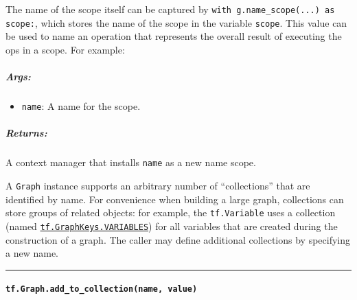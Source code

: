 The name of the scope itself can be captured by
\lstinline{with g.name_scope(...) as scope:}, which stores the name of
the scope in the variable \lstinline{scope}. This value can be used to name
an operation that represents the overall result of executing the ops in
a scope. For example:

\begin{Shaded}
\begin{Highlighting}[]
\OperatorTok{=} 
 \NormalTok{) } 
  \OperatorTok{=} \OperatorTok{=}\NormalTok{)}
  \OperatorTok{=} \OperatorTok{=}\NormalTok{)}
  \OperatorTok{=} \OperatorTok{+} 
  \OperatorTok{=} \OperatorTok{=}
\end{Highlighting}
\end{Shaded}

\subparagraph{Args: }\label{args-3}

\begin{itemize}
\tightlist
\item
  \lstinline{name}: A name for the scope.
\end{itemize}

\subparagraph{Returns: }\label{returns-4}

A context manager that installs \lstinline{name} as a new name scope.

A \lstinline{Graph} instance supports an arbitrary number of
``collections'' that are identified by name. For convenience when
building a large graph, collections can store groups of related objects:
for example, the \lstinline{tf.Variable} uses a collection (named
\href{../../api_docs/python/framework.md\#GraphKeys}{\lstinline{tf.GraphKeys.VARIABLES}})
for all variables that are created during the construction of a graph.
The caller may define additional collections by specifying a new name.

\begin{center}\rule{0.5\linewidth}{\linethickness}\end{center}

\paragraph{\texorpdfstring{\lstinline{tf.Graph.add_to_collection(name, value)}
}{tf.Graph.add_to_collection(name, value) }}\label{tf.graph.addux5ftoux5fcollectionname-value}

